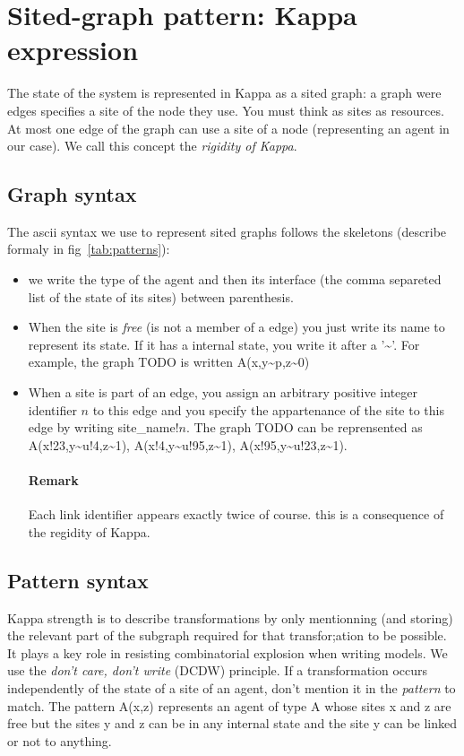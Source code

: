 \documentclass[11pt]{book}
\def\intstate{\textasciitilde}
\newcommand{\Remark}{\paragraph{Remark}}
\begin{document}
\section{Sited-graph pattern: Kappa expression}

The state of the system is represented in Kappa as a sited graph: a
graph were edges specifies a site of the node they use. You must think
as sites as resources. At most one edge of the graph can use a site of
a node (representing an agent in our case). We call this concept the
\emph{rigidity of Kappa}.

\subsection{Graph syntax}
The ascii syntax we use to represent sited graphs follows the
skeletons (describe formaly in fig~\ref{tab:patterns}):
\begin{itemize}
\item we write the type of the agent and then its interface (the comma
  separeted list of the state of its sites) between parenthesis.
\item When the site is \emph{free} (is not a member of a edge) you
  just write its name to represent its state. If it has a internal
  state, you write it after a '\intstate'. For example, the graph
  TODO is written A(x,y\intstate{}p,z\intstate{}0)
\item When a site is part of an edge, you assign an arbitrary positive
  integer identifier $n$ to this edge and you specify the appartenance
  of the site to this edge by writing site\_name$!n$. The graph TODO
  can be reprensented as A(x!23,y\intstate{}u!4,z\intstate{}1),
  A(x!4,y\intstate{}u!95,z\intstate{}1),
  A(x!95,y\intstate{}u!23,z\intstate{}1).

  \Remark{Each link identifier appears exactly twice of course. this is a
  consequence of the regidity of Kappa.}
\end{itemize}

\subsection{Pattern syntax}
Kappa strength is to describe transformations by only mentionning (and
storing) the relevant part of the subgraph required for that
transfor;ation to be possible. It plays a key role in resisting
combinatorial explosion when writing models. We use the \emph{don't
  care, don't write} (DCDW) principle. If a
transformation occurs independently of the state of a site of an
agent, don't mention it in the \emph{pattern} to match. The pattern
A(x,z) represents an agent of type A whose sites x and z are free but
the sites y and z can be in any internal state and the site y can be
linked or not to anything.
\end{document}
